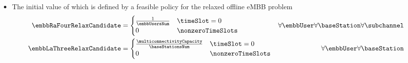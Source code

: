 \begin{frame}
  \begin{itemize}
    \item The initial value of which is defined by a feasible policy for the relaxed offline eMBB problem\proofFootnote
      \begin{align}
        \embbRaFourRelaxCandidate &=
          \begin{cases}
            \frac{1}{\embbUsersNum} &\timeSlot = 0\\
            0 &\nonzeroTimeSlots
          \end{cases} &\forall\embbUser \forall\baseStation \forall\subchannel\\
        \embbLaThreeRelaxCandidate &=
          \begin{cases}
            \frac{\multiconnectivityCapacity}{\baseStationsNum} &\timeSlot = 0\\
            0 &\nonzeroTimeSlots
          \end{cases} &\forall\embbUser \forall\baseStation
      \end{align}
  \end{itemize}
\end{frame}
